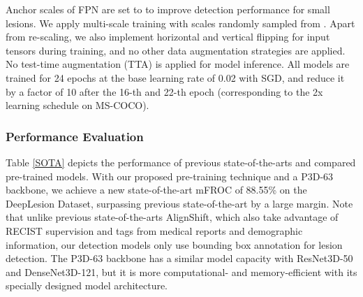 \documentclass[journal,twoside,web]{ieeecolor}
\begin{document}
Anchor scales of FPN are set to  to improve detection performance for small lesions. We apply multi-scale training with scales randomly sampled from . Apart from re-scaling, we also implement horizontal and vertical flipping for input tensors during training, and no other data augmentation strategies are applied. No test-time augmentation (TTA) is applied for model inference. All models are trained for 24 epochs at the base learning rate of 0.02 with SGD, and reduce it by a factor of 10 after the 16-th and 22-th epoch (corresponding to the 2x learning schedule\cite{he2019rethinking} on MS-COCO). 




\subsubsection{Performance Evaluation}
Table \ref{SOTA} depicts the performance of previous state-of-the-arts and compared pre-trained models. With our proposed pre-training technique and a P3D-63~\cite{hara2017learning} backbone, we achieve a new state-of-the-art mFROC of 88.55\% on the DeepLesion Dataset, surpassing previous state-of-the-art by a large margin. Note that unlike previous state-of-the-arts AlignShift, which also take advantage of RECIST supervision and tags from medical reports and demographic information, our detection models only use bounding box annotation for lesion detection. The P3D-63 backbone has a similar model capacity with ResNet3D-50 and DenseNet3D-121, but it is more computational- and memory-efficient with its specially designed model architecture. 
\end{document}
